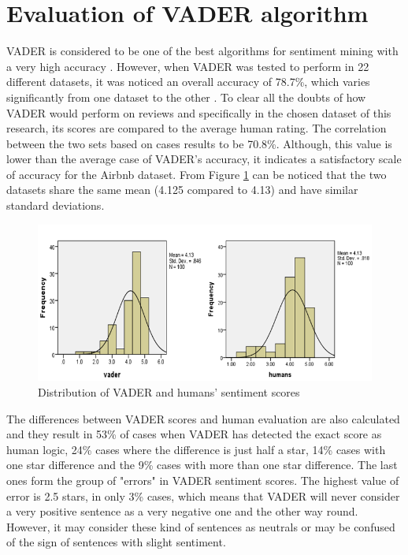 \section{Evaluation of VADER algorithm}
VADER is considered to be one of the best algorithms for sentiment mining with a very high accuracy \cite{hutto2014vader}. However, when VADER was tested to perform in 22 different datasets, it was noticed an overall accuracy of 78.7\%, which varies significantly from one dataset to the other \cite{ribeiro2015benchmark}. To clear all the doubts of how VADER would perform on reviews and specifically in the chosen dataset of this research, its scores are compared to the average human rating. The correlation between the two sets based on cases results to be 70.8\%. Although, this value is lower than the average case of VADER's accuracy, it indicates a satisfactory scale of accuracy for the Airbnb dataset. From Figure \ref{fig:distribution} can be noticed that the two datasets share the same mean (4.125 compared to 4.13) and have similar standard deviations. 
\begin{figure}[h!]
	\centering
	\includegraphics[height=0.33\textheight]{graphs_vader_humans}
	\caption{Distribution of VADER and humans' sentiment scores}
	\label{fig:distribution}
\end{figure}
The differences between VADER scores and human evaluation are also calculated and they result in 53\% of cases when VADER has detected the exact score as human logic, 24\% cases where the difference is just half a star, 14\% cases with one star difference and the 9\% cases with more than one star difference. The last ones form the group of "errors" in VADER sentiment scores. The highest value of error is 2.5 stars, in only 3\% cases, which means that VADER will never consider a very positive sentence as a very negative one and the other way round. However, it may consider these kind of sentences as neutrals or may be confused of the sign of sentences with slight sentiment.

